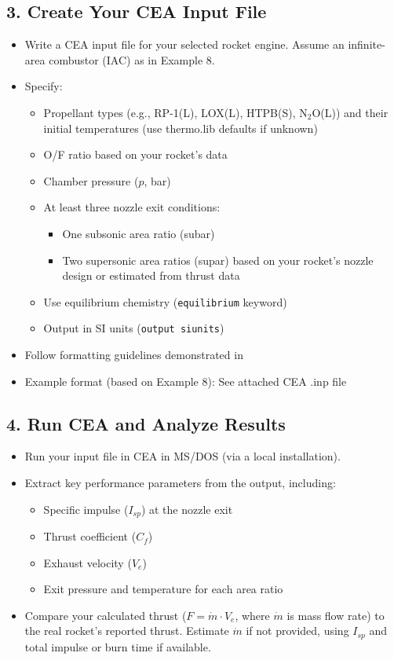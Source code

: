 \documentclass[12pt]{article}
\begin{document}
\subsection{3. Create Your CEA Input File}
\begin{itemize}
    \item Write a CEA input file for your selected rocket engine. Assume an infinite-area combustor (IAC) as in Example 8.
    \item Specify:
    \begin{itemize}
        \item Propellant types (e.g., RP-1(L), LOX(L), HTPB(S), N$_2$O(L)) and their initial temperatures (use thermo.lib defaults if unknown)
        \item O/F ratio based on your rocket's data
        \item Chamber pressure ($p$, bar)
        \item At least three nozzle exit conditions:
        \begin{itemize}
            \item One subsonic area ratio (subar)
            \item Two supersonic area ratios (supar) based on your rocket's nozzle design or estimated from thrust data
        \end{itemize}
        \item Use equilibrium chemistry (\texttt{equilibrium} keyword)
        \item Output in SI units (\texttt{output siunits})
    \end{itemize}
    \item Follow formatting guidelines demonstrated in \cite{lecture7}
    \item Example format (based on Example 8): See attached CEA .inp file
\end{itemize}

\subsection{4. Run CEA and Analyze Results}
\begin{itemize}
    \item Run your input file in CEA in MS/DOS (via a local installation).
    \item Extract key performance parameters from the output, including:
    \begin{itemize}
        \item Specific impulse ($I_{sp}$) at the nozzle exit
        \item Thrust coefficient ($C_f$)
        \item Exhaust velocity ($V_e$)
        \item Exit pressure and temperature for each area ratio
    \end{itemize}
    \item Compare your calculated thrust ($F = \dot{m} \cdot V_e$, where $\dot{m}$ is mass flow rate) to the real rocket's reported thrust. Estimate $\dot{m}$ if not provided, using $I_{sp}$ and total impulse or burn time if available.
\end{itemize}
\end{document}
